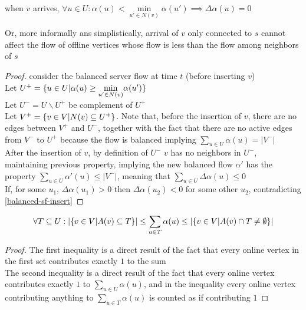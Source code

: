 \begin{lemma}
	\label{balanced-sf-affects}
	when $v$ arrives, $\forall u\in U:\alpha(u)<\underset{u'\in N(v)}{\min}\alpha(u')\implies\Delta\alpha(u)=0$
\end{lemma}
Or, more informally ans simplistically, arrival of $v$ only connected to $s$ cannot affect the flow of offline vertices whose flow is less than the flow among neighbors of $s$
\begin{proof}
	consider the balanced server flow at time $t$ (before inserting $v$)\\
	Let $U^+=\{u\in U|\alpha(u)\geq\underset{u'\in N(v)}{\min}\alpha(u')\}$\\
	Let $U^-=U\backslash U^+$ be complement of $U^+$\\
	Let $V^+=\{v\in V|N(v)\subseteq U^+\}$. Note that, before the insertion of $v$, there are no edges between $V^+$ and $U^-$, together with the fact that there are no active edges from $V^-$ to $U^+$ because the flow is balanced implying $\sum\limits_{u\in U}\alpha(u)=|V^-|$\\
	After the insertion of $v$, by definition of $U^-$ $v$ has no neighbors in $U^-$, maintaining previous property, implying the new balanced flow $\alpha'$ has the property $\sum\limits_{u\in U}\alpha'(u)\leq |V^-|$, meaning that $\sum\limits_{u\in U}\Delta\alpha(u)\leq 0$\\
	If, for some $u_1$, $\Delta\alpha(u_1)>0$ then $\Delta\alpha(u_2)<0$ for some other $u_2$, contradicting \autoref{balanced-sf-insert}
\end{proof}

\begin{lemma}
	\begin{align*}
		\forall T\subseteq U: |\{v\in V|A(v)\subseteq T\}|\leq \sum\limits_{u\in T}\alpha(u)\leq |\{v\in V|A(v)\cap T\neq\emptyset\}|
	\end{align*}
\end{lemma}
\begin{proof}
	The first inequality is a direct result of the fact that every online vertex in the first set contributes exactly $1$ to the sum\\
	The second inequality is a direct result of the fact that every online vertex contributes exactly $1$ to $\sum\limits_{u\in U}\alpha(u)$, and in the inequality every online vertex contributing anything to $\sum\limits_{u\in T}\alpha(u)$ is counted as if contributing $1$
\end{proof}

